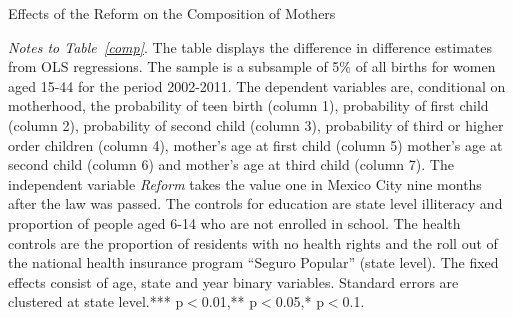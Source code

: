 \documentclass[a4paper, 11pt]{article}
\begin{document}
\begin{spacing}{2}
\begin{table}\caption{Effects of the Reform on the Composition of Mothers}\label{comp}
  \centering
\begin{threeparttable}

\begin{tablenotes}
\footnotesize
\item \textit{Notes to Table~\ref{comp}}. The table displays the difference in difference estimates from OLS regressions. The sample is a subsample of 5\% of all births for women aged 15-44 for the period 2002-2011. The dependent variables are, conditional on motherhood, the probability of teen birth (column 1), probability of first child (column 2), probability of second child (column 3), probability of third or higher order children (column 4), mother's age at first child (column 5) mother's age at second child (column 6) and mother's age at third child (column 7). The independent variable \textit{Reform} takes the value one in Mexico City nine months after the law was passed. The controls for education are state level illiteracy and proportion of people aged 6-14 who are not enrolled in school. The health controls are the proportion of residents with no health rights and the roll out of the national health insurance program ``Seguro Popular'' (state level). The fixed effects consist of age, state and year binary variables. Standard errors are clustered at state level.*** p$<$0.01,** p$<$0.05,* p$<$0.1.
\end{tablenotes} 
\end{threeparttable}
 \end{table} 
 

\end{spacing}
\end{document}
